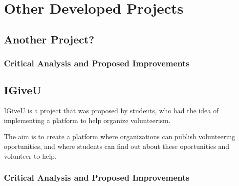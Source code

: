 

\chapter{Other Developed Projects}
\label{ch:projects}

\section{Another Project?}

\subsection{Critical Analysis and Proposed Improvements}

\section{IGiveU}

IGiveU is a project that was proposed by students, who had the idea of implementing a platform to help organize volunteerism.

The aim is to create a platform where organizations can publish volunteering oportunities, and where students can find out about these oportunities and volunteer to help.

\subsection{Critical Analysis and Proposed Improvements}
